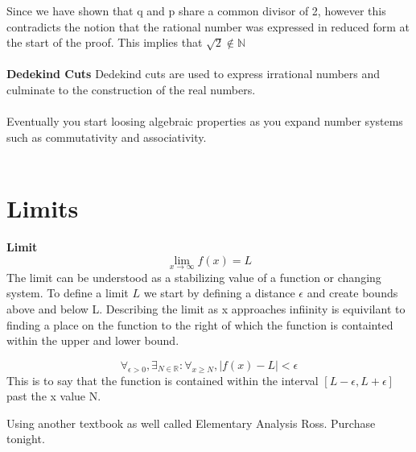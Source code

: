 \documentclass[12pt]{article}
\newcommand{\sect}[1]{\section*{#1}}
\newcommand{\R}{\mathbb{R}}
\newcommand{\xlim}{\lim_{x\rightarrow \infty}}
\newcommand{\ep}{\epsilon}
\begin{document}
Since we have shown that q and p share a common divisor of 2, however this contradicts the notion that the rational number was expressed in reduced form at the start of the proof. This implies that $\sqrt{2} \notin \mathbb{N}$\\\\
\textbf{Dedekind Cuts} Dedekind cuts are used to express irrational numbers and culminate to the construction of the real numbers.\\\\
Eventually you start loosing algebraic properties as you expand number systems such as commutativity and associativity. \\\\
\sect{Limits}
\textbf{Limit}
\[
  \xlim f(x)=L
\]
The limit can be understood as a stabilizing value of a function or changing system. To define a limit $L$ we start by defining a distance $\ep$ and create bounds above and below L. Describing the limit as x approaches infiinity is equivilant to finding a place on the function to the right of which the function is containted within the upper and lower bound.

\[
  \forall_{\ep > 0}, \exists_{N\in \R} : \forall_{x \geq N} , |f(x)-L|<\ep
\]
This is to say that the function is contained within the interval $ [L-\ep, L+\ep]$ past the x value N.

Using another textbook as well called Elementary Analysis Ross. Purchase tonight.
\end{document}
